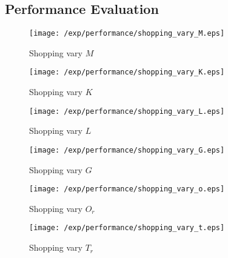\subsection{Performance Evaluation}
\begin{figure*}[t]
\centering
    \begin{subfigure}[b]{0.16\textwidth}
        \texttt{[image: /exp/performance/shopping\_vary\_M.eps]}
	     \caption{Shopping vary $M$}	
    \end{subfigure}
    \begin{subfigure}[b]{0.16\textwidth}
        \texttt{[image: /exp/performance/shopping\_vary\_K.eps]}
        \caption{Shopping vary $K$}
    \end{subfigure}
    \begin{subfigure}[b]{0.16\textwidth}
        \texttt{[image: /exp/performance/shopping\_vary\_L.eps]}
        \caption{Shopping vary $L$}
    \end{subfigure}
       \begin{subfigure}[b]{0.16\textwidth}
        \texttt{[image: /exp/performance/shopping\_vary\_G.eps]}
        \caption{Shopping vary $G$}
    \end{subfigure}
	\begin{subfigure}[b]{0.16\textwidth}
	 \texttt{[image: /exp/performance/shopping\_vary\_o.eps]}
        \caption{Shopping vary $O_r$}
    \end{subfigure}
        \begin{subfigure}[b]{0.16\textwidth}
	 \texttt{[image: /exp/performance/shopping\_vary\_t.eps]}
        \caption{Shopping vary $T_r$}
    \end{subfigure}
        

\end{figure*}
